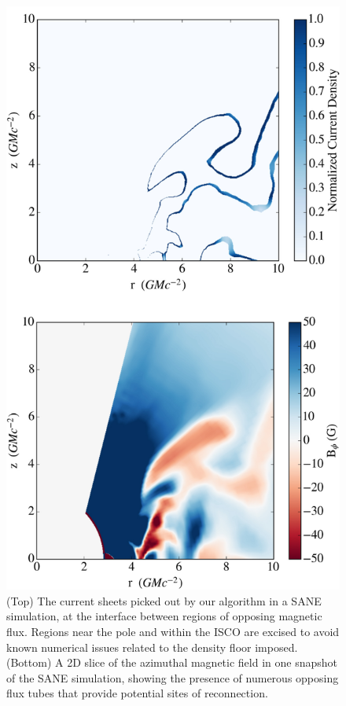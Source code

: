 \begin{figure}[!h]
\centering
\includegraphics[width =.6\textwidth]{paper2_fig1.jpg}
\caption{(Top) The current sheets picked out by our algorithm in a SANE simulation, at the interface between regions of opposing magnetic flux.  Regions near the pole and within the ISCO are excised to avoid known numerical issues related to the density floor imposed.  (Bottom) A 2D slice of the azimuthal magnetic field in one snapshot of the SANE simulation, showing the presence of numerous opposing flux tubes that provide potential sites of reconnection.}
\label{SANE_snapshot}
\end{figure}


